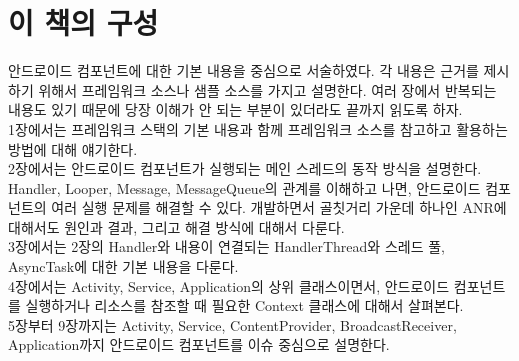 \documentclass[a4paper,hidelinks,10pt,openany]{book} %
\begin{document}

\newpage

\begin{comment}
\begin{abstract}
잘 만든 앱은 다 그럭저럭이지만, 그렇지 않은 앱은 제각각의 이유가 있다. 여기서는 그럭저럭한 앱을 만드는 원리와 방법을 찾아보고, 문제를 발생시키는 제각각의 이유에 대해서도 얘기해보자.
\end{abstract}
\end{comment}

\chapter*{이 책의 구성}
안드로이드 컴포넌트에 대한 기본 내용을 중심으로 서술하였다. 각 내용은 근거를 제시하기 위해서 프레임워크 소스나 샘플 소스를 가지고 설명한다.
여러 장에서 반복되는 내용도 있기 때문에 당장 이해가 안 되는 부분이 있더라도 끝까지 읽도록 하자.\\

1장에서는 프레임워크 스택의 기본 내용과 함께 프레임워크 소스를 참고하고 활용하는 방법에 대해 얘기한다.\\

2장에서는 안드로이드 컴포넌트가 실행되는 메인 스레드의 동작 방식을 설명한다.
Handler, Looper, Message, MessageQueue의 관계를 이해하고 나면, 안드로이드 컴포넌트의 여러 실행 문제를 해결할 수 있다. 
개발하면서 골칫거리 가운데 하나인 ANR에 대해서도 원인과 결과, 그리고 해결 방식에 대해서 다룬다.\\

3장에서는 2장의 Handler와 내용이 연결되는 HandlerThread와 스레드 풀, AsyncTask에 대한 기본 내용을 다룬다.\\

4장에서는 Activity, Service, Application의 상위 클래스이면서, 안드로이드 컴포넌트를 실행하거나 리소스를 참조할 때 필요한 Context 클래스에 대해서 살펴본다.\\

5장부터 9장까지는 Activity, Service, ContentProvider, BroadcastReceiver, Application까지 안드로이드 컴포넌트를 이슈 중심으로 설명한다.\\
\end{document}
